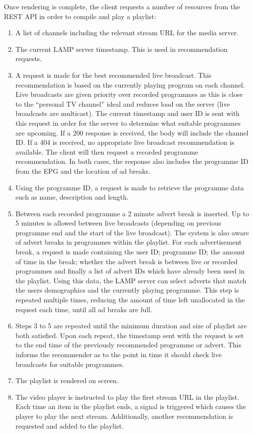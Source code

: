 Once rendering is complete, the client requests a number of resources from the REST API in order to compile and play a playlist:

\begin{enumerate}
	\item A list of channels including the relevant stream URL for the media server.
	\item The current LAMP server timestamp. This is used in recommendation requests.
	\item A request is made for the best recommended live broadcast. This recommendation is based on the currently playing program on each channel. Live broadcasts are given priority over recorded programmes as this is close to the ``personal TV channel'' ideal and reduces load on the server (live broadcasts are multicast). The current timestamp and user ID is sent with this request in order for the server to determine what suitable programmes are upcoming. If a 200 response is received, the body will include the channel ID. If a 404 is received, no appropriate live broadcast recommendation is available. The client will then request a recorded programme recommendation. In both cases, the response also includes the programme ID from the EPG and the location of ad breaks.
	\item Using the programme ID, a request is made to retrieve the programme data such as name, description and length.
	\item Between each recorded programme a 2 minute advert break is inserted. Up to 5 minutes is allowed between live broadcasts (depending on previous programme end and the start of the live broadcast). The system is also aware of advert breaks in programmes within the playlist. For each advertisement break, a request is made containing the user ID; programme ID; the amount of time in the break; whether the advert break is between live or recorded programmes and finally a list of advert IDs which have already been used in the playlist. Using this data, the LAMP server can select adverts that match the users demographics and the currently playing programme. This step is repeated multiple times, reducing the amount of time left unallocated in the request each time, until all ad breaks are full.
	\item Steps 3 to 5 are repeated until the minimum duration and size of playlist are both satisfied. Upon each repeat, the timestamp sent with the request is set to the end time of the previously recommended programme or advert. This informs the recommender as to the point in time it should check live broadcasts for suitable programmes.
	\item The playlist is rendered on screen.
	\item The video player is instructed to play the first stream URL in the playlist. Each time an item in the playlist ends, a signal is triggered which causes the player to play the next stream. Additionally, another recommendation is requested and added to the playlist.
\end{enumerate}

